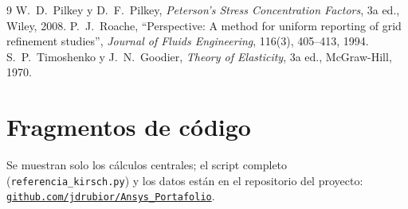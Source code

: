 \documentclass[11pt,letterpaper]{article}
\begin{document}
\begin{thebibliography}{9}
 W.~D.~Pilkey y D.~F.~Pilkey, \emph{Peterson's Stress Concentration Factors}, 3a ed., Wiley, 2008.
 P.~J.~Roache, ``Perspective: A method for uniform reporting of grid refinement studies'', \emph{Journal of Fluids Engineering}, 116(3), 405--413, 1994.
 S.~P.~Timoshenko y J.~N.~Goodier, \emph{Theory of Elasticity}, 3a ed., McGraw-Hill, 1970.
\end{thebibliography}
\appendix
\section{Fragmentos de código}
\label{ap:codigo}
Se muestran solo los cálculos centrales; el script completo (\texttt{referencia\_kirsch.py}) y los datos están en el repositorio del proyecto: \href{https://github.com/jdrubior/Ansys_Portafolio}{\texttt{github.com/jdrubior/Ansys\_Portafolio}}.



\end{document}
